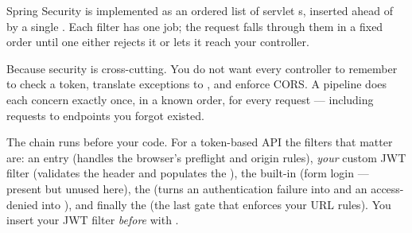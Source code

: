 
 Spring Security is implemented as an ordered list of servlet s, inserted ahead of  by a single . Each filter has one job; the request falls through them in a fixed order until one either rejects it or lets it reach your controller.

 Because security is cross-cutting. You do not want every controller to remember to check a token, translate exceptions to , and enforce CORS. A pipeline does each concern exactly once, in a known order, for every request --- including requests to endpoints you forgot existed.

 The chain runs before your code. For a token-based API the filters that matter are: an entry  (handles the browser's preflight and origin rules), \emph{your} custom JWT filter (validates the  header and populates the ), the built-in  (form login --- present but unused here), the  (turns an authentication failure into  and an access-denied into ), and finally the  (the last gate that enforces your URL rules). You insert your JWT filter \emph{before}  with .

